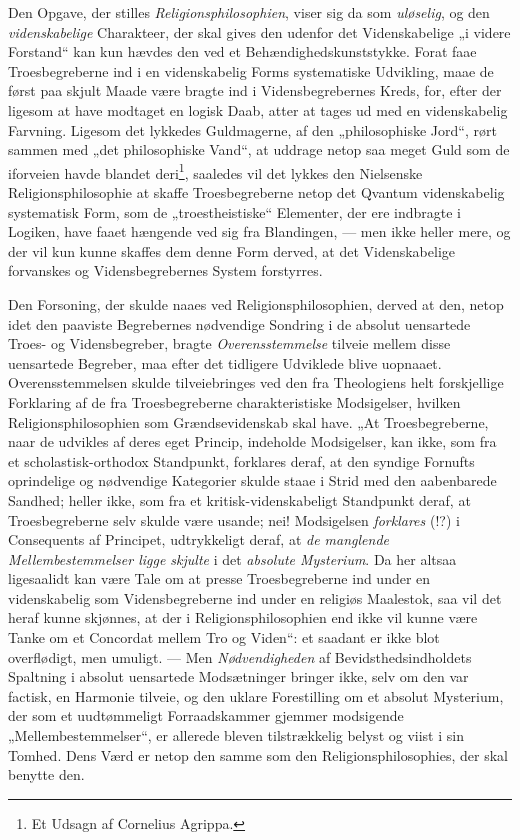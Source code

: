 \documentclass[12pt,a4paper]{book}
\newcommand{\opage}[1]{\marginnote{\footnotesize\textit{[#1]}}}
\begin{document}
Den Opgave, der stilles \emph{Religionsphilosophien}, viser sig da som \emph{uløselig}, og den \emph{videnskabelige} Charakteer, der skal gives den udenfor det Videnskabelige „i videre Forstand“ kan
kun hævdes den ved et Behændighedskunststykke. Forat faae Troesbegreberne ind i en videnskabelig
Forms systematiske Udvikling, maae de først paa skjult Maade være bragte ind i Vidensbegrebernes
Kreds, for, efter der ligesom at have modtaget en logisk Daab, atter at tages ud med en
videnskabelig Farvning. Ligesom det lykkedes Guldmagerne, af den „philosophiske Jord“, rørt
sammen med „det philosophiske Vand“, at uddrage netop saa meget Guld som de iforveien havde
blandet deri\footnote{Et Udsagn af Cornelius Agrippa.}, saaledes vil det lykkes den Nielsenske
Religionsphilosophie at skaffe Troesbegreberne netop det Qvantum videnskabelig systematisk Form,
som de „troestheistiske“ Elementer, der ere indbragte i Logiken, have faaet hængende ved sig fra
Blandingen, --- men ikke heller mere, og der vil kun kunne skaffes dem denne Form derved, at det
Videnskabelige forvanskes og Vidensbegrebernes System forstyrres.

Den Forsoning, der skulde naaes ved Religionsphilosophien, derved at den, netop idet den paaviste
Begrebernes nødvendige Sondring i de absolut uensartede Troes- og Vidensbegreber, bragte
\emph{Overensstemmelse} tilveie mellem disse uensartede Begreber, maa efter det tidligere
Udviklede blive uopnaaet. Overensstemmelsen skulde tilveiebringes ved den fra Theologiens helt
forskjellige Forklaring af de fra Troesbegreberne charakteristiske Modsigelser, hvilken
Religionsphilosophien som Grændsevidenskab skal have. „At Troesbegreberne, naar de udvikles af
deres eget Princip, indeholde Modsigelser, kan ikke, som fra et scholastisk-orthodox Standpunkt,
forklares deraf, at den syndige Fornufts oprindelige og nødvendige Kategorier skulde staae i
Strid med den aabenbarede Sandhed; heller ikke, som fra et kri\opage{210}tisk-videnskabeligt Standpunkt
deraf, at Troesbegreberne selv skulde være usande; nei! Modsigelsen \emph{forklares} (!?) i Consequents
af Principet, udtrykkeligt deraf, at \emph{de manglende Mellembestemmelser ligge skjulte} i det \emph{absolute Mysterium}. Da her altsaa ligesaalidt kan være Tale om at presse Troesbegreberne ind
under en videnskabelig som Vidensbegreberne ind under en religiøs Maalestok, saa vil det heraf
kunne skjønnes, at der i Religionsphilosophien end ikke vil kunne være Tanke om et Concordat
mellem Tro og Viden“: et saadant er ikke blot overflødigt, men umuligt. --- Men \emph{Nødvendigheden} af
Bevidsthedsindholdets Spaltning i absolut uensartede Modsætninger bringer ikke, selv om den var
factisk, en Harmonie tilveie, og den uklare Forestilling om et absolut Mysterium, der som et
uudtømmeligt Forraadskammer gjemmer modsigende „Mellembestemmelser“, er allerede bleven
tilstrækkelig belyst og viist i sin Tomhed. Dens Værd er netop den samme som den
Religionsphilosophies, der skal benytte den.
\end{document}
